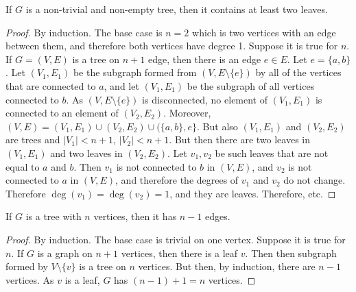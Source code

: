             \begin{theorem}
                If $G$ is a non-trivial and non-empty tree, then
                it contains at least two leaves.
            \end{theorem}
            \begin{proof}
                By induction. The base case is $n=2$ which is
                two vertices with an edge between them, and therefore
                both vertices have degree 1. Suppose it is true for $n$.
                If $G=(V,E)$ is a tree on $n+1$ edge, then there is
                an edge $e\in{E}$. Let $e=\{a,b\}$. Let
                $(V_{1},E_{1})$ be the subgraph formed from
                $(V,E\setminus\{e\})$ by all of the vertices that are
                connected to $a$, and let $(V_{1},E_{1})$ be the
                subgraph of all vertices connected to $b$. As
                $(V,E\setminus\{e\})$ is disconnected,
                no element of $(V_{1},E_{1})$ is connected to an element
                of $(V_{2},E_{2})$. Moreover,
                $(V,E)=(V_{1},E_{1})\cup(V_{2},E_{2})\cup(\{a,b\},e\}$.
                But also $(V_{1},E_{1})$ and $(V_{2},E_{2})$ are trees
                and $|V_{1}|<n+1$, $|V_{2}|<n+1$. But then there are
                two leaves in $(V_{1},E_{1})$ and two leaves in
                $(V_{2},E_{2})$. Let $v_{1},v_{2}$ be such leaves that
                are not equal to $a$ and $b$. Then
                $v_{1}$ is not connected to $b$ in $(V,E)$, and
                $v_{2}$ is not connected to $a$ in $(V,E)$, and therefore
                the degrees of $v_{1}$ and $v_{2}$ do not change.
                Therefore $\deg(v_{1})=\deg(v_{2})=1$, and they are
                leaves. Therefore, etc.
            \end{proof}
            \begin{theorem}
                If $G$ is a tree with $n$ vertices, then it has
                $n-1$ edges.
            \end{theorem}
            \begin{proof}
                By induction. The base case is trivial on one vertex.
                Suppose it is true for $n$. If $G$ is a graph on
                $n+1$ vertices, then there is a leaf $v$.
                Then then subgraph formed by
                $V\setminus\{v\}$ is a tree on $n$ vertices. But then,
                by induction, there are $n-1$ vertices. As $v$ is a leaf,
                $G$ has $(n-1)+1=n$ vertices.
            \end{proof}
